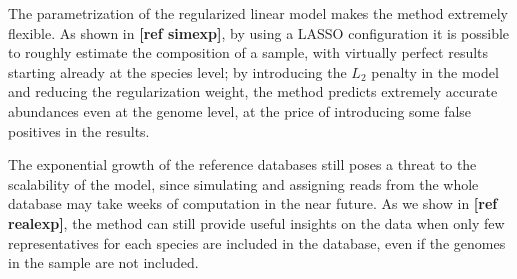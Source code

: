 The parametrization of the regularized linear model makes the method extremely flexible. As shown in \textbf{[ref simexp]}, by using a LASSO configuration it is possible to roughly estimate the composition of a sample, with virtually perfect results starting already at the species level; by introducing the $L_2$ penalty in the model and reducing the regularization weight, the method predicts extremely accurate abundances even at the genome level, at the price of introducing some false positives in the results.

The exponential growth of the reference databases still poses a threat to the scalability of the model, since simulating and assigning reads from the whole database may take weeks of computation in the near future. As we show in \textbf{[ref realexp]}, the method can still provide useful insights on the data when only few representatives for each species are included in the database, even if the genomes in the sample are not included.
